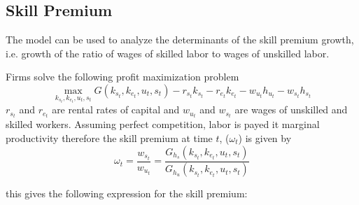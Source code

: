 \documentclass[12pt]{article}
\begin{document}
\subsection{Skill Premium}
The model can be used to analyze the determinants of the skill premium growth, i.e. growth of  the ratio of wages of skilled labor to wages of unskilled labor. 

Firms solve the following profit maximization problem 
\begin{equation}\label{eq:profit_max}
  \max_{k_{s_t}, k_{e_t}, u_t, s_t} G(k_{s_t}, k_{e_t}, u_t, s_t) - r_{s_t}k_{s_t} - r_{e_t}k_{e_t} - w_{u_t} h_{u_t} - w_{s_t} h_{s_t}
\end{equation}
$r_{s_t}$ and $r_{e_t}$ are rental rates of capital and  $w_{u_t}$ and $w_{s_t}$ are wages of unskilled and skilled workers. Assuming perfect competition, labor is payed it marginal productivity therefore the skill premium at time $t$, ($\omega_t$) is given by
\begin{equation}
  \omega_t = \frac{w_{s_t}}{w_{u_t}} = \frac{G_{h_s}(k_{s_t}, k_{e_t}, u_t, s_t) }{G_{h_u}(k_{s_t}, k_{e_t}, u_t, s_t) }
\end{equation}

this gives the following expression for the skill premium:
\end{document}
